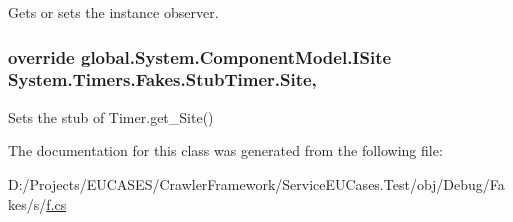 Gets or sets the instance observer.

\hypertarget{class_system_1_1_timers_1_1_fakes_1_1_stub_timer_a4cccf4f3aba8efcf73f470b0b8a76da0}{
\subsubsection[{Site}]{\setlength{\rightskip}{0pt plus 5cm}override global.\-System.\-Component\-Model.\-I\-Site System.\-Timers.\-Fakes.\-Stub\-Timer.\-Site\hspace{0.3cm}{\ttfamily [get]}, {\ttfamily [set]}}}\label{class_system_1_1_timers_1_1_fakes_1_1_stub_timer_a4cccf4f3aba8efcf73f470b0b8a76da0}


Sets the stub of Timer.\-get\-\_\-\-Site()



The documentation for this class was generated from the following file\-:\begin{DoxyCompactItemize}
\item 
D\-:/\-Projects/\-E\-U\-C\-A\-S\-E\-S/\-Crawler\-Framework/\-Service\-E\-U\-Cases.\-Test/obj/\-Debug/\-Fakes/s/\hyperlink{s_2f_8cs}{f.\-cs}\end{DoxyCompactItemize}
